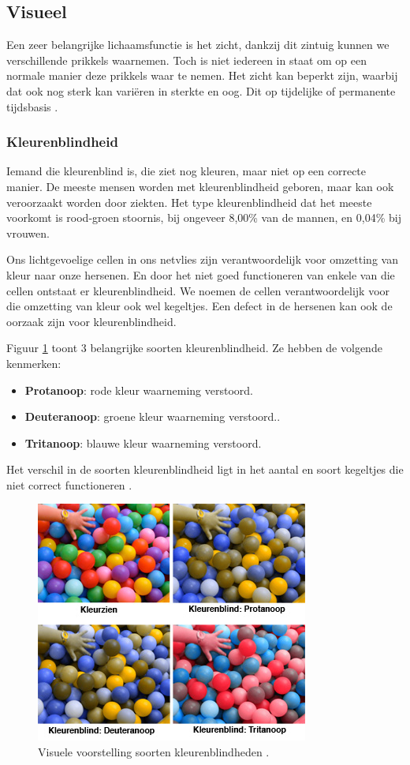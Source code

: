 \subsection{Visueel}
\label{sec:Visueel}
Een zeer belangrijke lichaamsfunctie is het zicht, dankzij dit zintuig kunnen we verschillende prikkels waarnemen. Toch is niet iedereen in staat om op een normale manier deze prikkels waar te nemen. Het zicht kan beperkt zijn, waarbij dat ook nog sterk kan variëren in sterkte en oog. Dit op tijdelijke of permanente tijdsbasis \autocite{accessibility2019}.

\subsubsection{Kleurenblindheid}
Iemand die kleurenblind is, die ziet nog kleuren, maar niet op een correcte manier. De meeste mensen worden met kleurenblindheid geboren, maar kan ook veroorzaakt worden door ziekten.
Het type kleurenblindheid dat het meeste voorkomt is rood-groen stoornis, bij ongeveer 8,00\% van de mannen, en 0,04\% bij vrouwen. 

Ons lichtgevoelige cellen in ons netvlies zijn verantwoordelijk voor omzetting van kleur naar onze hersenen. En door het niet goed functioneren van enkele van die cellen ontstaat er kleurenblindheid. We noemen de cellen verantwoordelijk voor die omzetting van kleur ook wel kegeltjes. Een defect in de hersenen kan ook de oorzaak zijn voor kleurenblindheid. 

Figuur \ref{fig:ballenbak} toont 3 belangrijke soorten kleurenblindheid. Ze hebben de volgende kenmerken: 
\begin{itemize}
    \item \textbf{Protanoop}: rode kleur waarneming verstoord.
    \item \textbf{Deuteranoop}: groene kleur waarneming verstoord..
    \item \textbf{Tritanoop}: blauwe kleur waarneming verstoord.
\end{itemize}

Het verschil in de soorten kleurenblindheid ligt in het aantal en soort kegeltjes die niet correct functioneren \autocite{visioKleur2019}.



\begin{figure}[!h]
    \centering
    \includegraphics[width=0.5\linewidth]{img/ballenbak}
    \caption{Visuele voorstelling soorten kleurenblindheden \autocite{visioKleur2019}.}
    \label{fig:ballenbak}
\end{figure}



